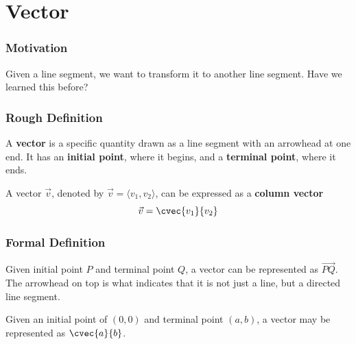 \section[Vector]{Vector}
\frame{\sectionpage}

\begin{frame}
\frametitle{Motivation}
Given a line segment, we want to transform it to another line segment. Have we learned this before?
\end{frame}

\begin{frame}{}
\end{frame}

\begin{frame}
\frametitle{Rough Definition}
\begin{defn}{}{}
A \textbf{vector} is a specific quantity drawn as a line segment with an arrowhead at one end. It has an \textbf{initial point}, where it begins, and a \textbf{terminal point}, where it ends.
\end{defn}

\begin{defn}{}{}
A vector $\vec{v}$, denoted by $\vec{v} = \langle v_1, v_2 \rangle$, can be expressed as a \textbf{column vector}
\begin{equation} \vec{v} = \cvec{v_1}{v_2} \end{equation}
\end{defn}
\end{frame}

\begin{frame}
\frametitle{Formal Definition}
\begin{defn}{}{}
Given initial point $P$  and terminal point $Q$,  a vector can be represented as $\overrightarrow{PQ}$.  The arrowhead on top is what indicates that it is not just a line, but a directed line segment.

\tcblower
Given an initial point of $ (0,0)$  and terminal point $ (a,b)$,  a vector may be represented as  $\cvec{a}{b}$.
\end{defn}
\end{frame}


\begin{frame}
\end{frame}


